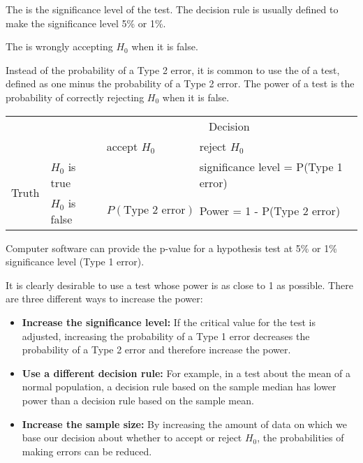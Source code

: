 \begin{definition}
    The  is the significance level of the test. The decision rule is usually defined to make the significance level 5\% or 1\%.
    
    The  is wrongly accepting $H_0$ when it is false.
\end{definition}

Instead of the probability of a Type 2 error, it is common to use the  of a test, defined as one minus the probability of a Type 2 error. The power of a test is the probability of correctly rejecting $H_0$ when it is false.
\begin{center}
    \begin{tabular}{p{2cm}p{2cm}|p{3cm}|p{3cm}}
     & & \multicolumn{2}{|c}{Decision} \\
     \cline{3-4}
     & & accept $H_0$ & reject $H_0$ \\
     \hline
     \multirow{3}{*}{Truth} & \multicolumn{1}{|l|}{$H_0$ is true} & \cellcolor{green} & \cellcolor{red}significance level = P(Type 1 error) \\
     \cline{2-4}
     & \multicolumn{1}{|l|}{$H_0$ is false} & \cellcolor{red}$P(\text{Type 2 error})$ & \cellcolor{green}Power = 1 - P(Type 2 error) \\
\end{tabular}
\end{center}

Computer software can provide the p-value for a hypothesis test at 5\% or 1\% significance level (Type 1 error).

It is clearly desirable to use a test whose power is as close to 1 as possible. There are three different ways to increase the power:
\begin{itemize}
    \item \textbf{Increase the significance level:} If the critical value for the test is adjusted, increasing the probability of a Type 1 error decreases the probability of a Type 2 error and therefore increase the power.
    \item \textbf{Use a different decision rule:} For example, in a test about the mean of a normal population, a decision rule based on the sample median has lower power than a decision rule based on the sample mean.
    \item \textbf{Increase the sample size:} By increasing the amount of data on which we base our decision about whether to accept or reject $H_0$, the probabilities of making errors can be reduced.
\end{itemize}

